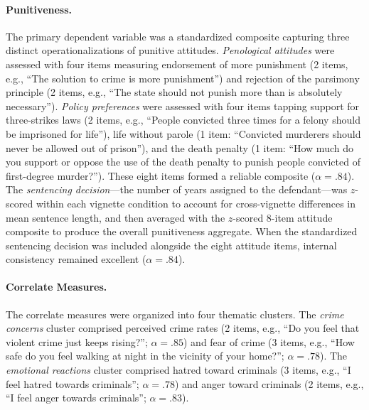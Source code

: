 \paragraph{Punitiveness.} The primary dependent variable was a standardized composite capturing three distinct operationalizations of punitive attitudes. \textit{Penological attitudes} were assessed with four items measuring endorsement of more punishment (2 items, e.g., ``The solution to crime is more punishment'') and rejection of the parsimony principle (2 items, e.g., ``The state should not punish more than is absolutely necessary''). \textit{Policy preferences} were assessed with four items tapping support for three-strikes laws (2 items, e.g., ``People convicted three times for a felony should be imprisoned for life''), life without parole (1 item: ``Convicted murderers should never be allowed out of prison''), and the death penalty (1 item: ``How much do you support or oppose the use of the death penalty to punish people convicted of first-degree murder?''). These eight items formed a reliable composite ($\alpha = .84$). The \textit{sentencing decision}---the number of years assigned to the defendant---was $z$-scored within each vignette condition to account for cross-vignette differences in mean sentence length, and then averaged with the $z$-scored 8-item attitude composite to produce the overall punitiveness aggregate. When the standardized sentencing decision was included alongside the eight attitude items, internal consistency remained excellent ($\alpha = .84$).

\paragraph{Correlate Measures.} The correlate measures were organized into four thematic clusters. The \textit{crime concerns} cluster comprised perceived crime rates (2 items, e.g., ``Do you feel that violent crime just keeps rising?''; $\alpha = .85$) and fear of crime (3 items, e.g., ``How safe do you feel walking at night in the vicinity of your home?''; $\alpha = .78$). The \textit{emotional reactions} cluster comprised hatred toward criminals (3 items, e.g., ``I feel hatred towards criminals''; $\alpha = .78$) and anger toward criminals (2 items, e.g., ``I feel anger towards criminals''; $\alpha = .83$).

